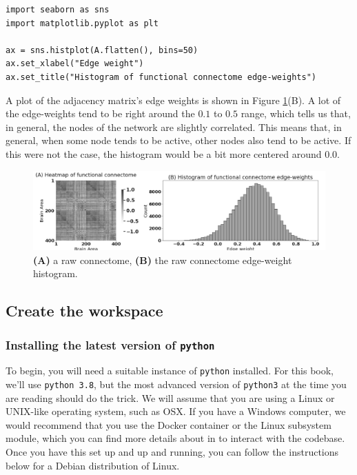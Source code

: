 \begin{lstlisting}[style=python]
import seaborn as sns
import matplotlib.pyplot as plt

ax = sns.histplot(A.flatten(), bins=50)
ax.set_xlabel("Edge weight")
ax.set_title("Histogram of functional connectome edge-weights")
\end{lstlisting}
A plot of the adjacency matrix's edge weights is shown in Figure \ref{fig:ch2:raw}(B). A lot of the edge-weights tend to be right around the $0.1$ to $0.5$ range, which tells us that, in general, the nodes of the network are {slightly correlated}. This means that, in general, when some node tends to be active, other nodes also tend to be active. If this were not the case, the histogram would be a bit more centered around $0.0$.

\begin{figure}[h]
    \centering
    \includegraphics[width=\linewidth]{foundations/ch2/Images/raw.png}
    \caption[Visualizing connectome data]{\textbf{(A)} a raw connectome, \textbf{(B)} the raw connectome edge-weight histogram.}
    \label{fig:ch2:raw}
\end{figure}

\subsection{Create the workspace}
\label{sec:ch2:get:install}
\subsubsection{Installing the latest version of \texttt{python}}

To begin, you will need a suitable instance of \texttt{python} installed. For this book, we'll use \texttt{python 3.8}, but the most advanced version of \texttt{python3} at the time you are reading should do the trick. We will assume that you are using a Linux or UNIX-like operating system, such as OSX. If you have a Windows computer, we would recommend that you use the Docker container or the Linux subsystem module, which you can find more details about in \cite{windowsss} to interact with the codebase. Once you have this set up and up and running, you can follow the instructions below for a Debian distribution of Linux.

